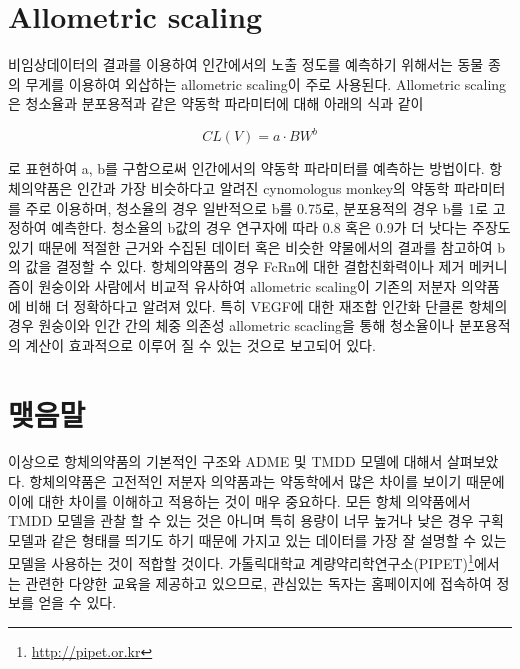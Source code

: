 \documentclass[
  11pt,
  krantz2, a4paper, twoside]{krantz}
\theoremstyle{definition}
\theoremstyle{definition}
\theoremstyle{definition}
\theoremstyle{definition}
\theoremstyle{remark}
\begin{document}
\section{Allometric scaling}\label{allometric-scaling}

비임상데이터의 결과를 이용하여 인간에서의 노출 정도를 예측하기 위해서는 동물 종의 무게를 이용하여 외삽하는 allometric scaling이 주로 사용된다. Allometric scaling은 청소율과 분포용적과 같은 약동학 파라미터에 대해 아래의 식과 같이

\begin{equation}
CL(V) = a \cdot BW^b
\label{eq:eq7-15}
\end{equation}

로 표현하여 a, b를 구함으로써 인간에서의 약동학 파라미터를 예측하는 방법이다. 항체의약품은 인간과 가장 비슷하다고 알려진 cynomologus monkey의 약동학 파라미터를 주로 이용하며, 청소율의 경우 일반적으로 b를 0.75로, 분포용적의 경우 b를 1로 고정하여 예측한다. 청소율의 b값의 경우 연구자에 따라 0.8 혹은 0.9가 더 낫다는 주장도 있기 때문에 적절한 근거와 수집된 데이터 혹은 비슷한 약물에서의 결과를 참고하여 b의 값을 결정할 수 있다.
항체의약품의 경우 FcRn에 대한 결합친화력이나 제거 메커니즘이 원숭이와 사람에서 비교적 유사하여 allometric scaling이 기존의 저분자 의약품에 비해 더 정확하다고 알려져 있다. 특히 VEGF에 대한 재조합 인간화 단클론 항체의 경우 원숭이와 인간 간의 체중 의존성 allometric scacling을 통해 청소율이나 분포용적의 계산이 효과적으로 이루어 질 수 있는 것으로 보고되어 있다.

\section{맺음말}\label{uxb9fauxc74cuxb9d0-5}

이상으로 항체의약품의 기본적인 구조와 ADME 및 TMDD 모델에 대해서 살펴보았다. 
항체의약품은 고전적인 저분자 의약품과는 약동학에서 많은 차이를 보이기 때문에 이에 대한 차이를 이해하고 적용하는 것이 매우 중요하다. 모든 항체 의약품에서 TMDD 모델을 관찰 할 수 있는 것은 아니며 특히 용량이 너무 높거나 낮은 경우 구획모델과 같은 형태를 띄기도 하기 때문에 가지고 있는 데이터를 가장 잘 설명할 수 있는 모델을 사용하는 것이 적합할 것이다.
가톨릭대학교 계량약리학연구소(PIPET)\footnote{\url{http://pipet.or.kr}}에서는 관련한 다양한 교육을 제공하고 있으므로, 관심있는 독자는 홈페이지에 접속하여 정보를 얻을 수 있다.

\cleardoublepage

\appendix {}
\end{document}

